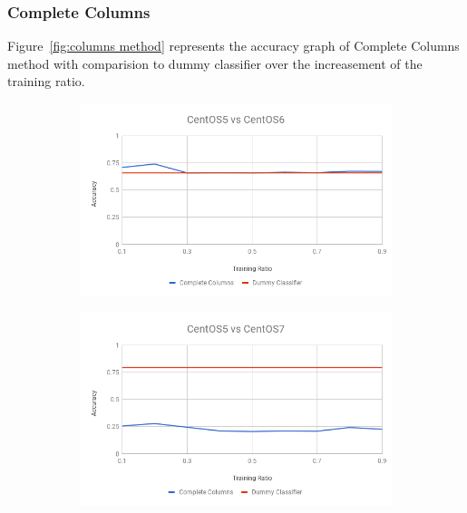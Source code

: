 \documentclass[10pt, conference, compsocconf]{IEEEtran}
\begin{document}
\subsubsection{Complete Columns}
Figure~\ref{fig:columns method} represents
the accuracy graph of Complete Columns method with comparision to dummy
classifier over the increasement of the training ratio.
\begin{figure}[h!]
        \centering
        \begin{subfigure}[b]{0.8\linewidth}
                \includegraphics[width=\columnwidth]{figures/ALS/columns-ALS-5vs6-PFS}
        \end{subfigure}
        \begin{subfigure}[b]{0.8\linewidth}
                \includegraphics[width=\columnwidth]{figures/ALS/columns-ALS-5vs7-PFS}
        \end{subfigure}
        \begin{subfigure}[b]{0.8\linewidth}

\end{subfigure}
\end{figure}
\end{document}
